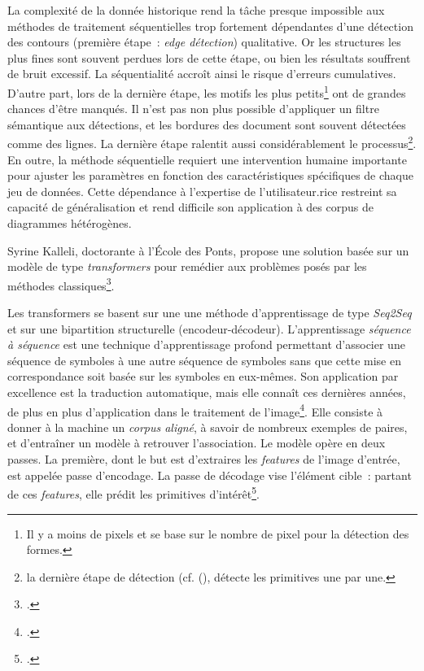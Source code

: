 La complexité de la donnée historique rend la tâche presque impossible
aux méthodes de traitement séquentielles trop fortement dépendantes d'une
détection des contours (première étape~: \emph{edge détection})
qualitative. Or les structures les plus fines sont souvent perdues lors
de cette étape, ou bien les résultats souffrent de bruit excessif. La
séquentialité accroît ainsi le risque d'erreurs cumulatives. D'autre
part, lors de la dernière étape, les motifs les plus petits\footnote{Il
  y a moins de pixels et \ransac se base sur le nombre de pixel pour la
  détection des formes.} ont de grandes chances d'être manqués. Il n'est
pas non plus possible d'appliquer un filtre sémantique aux détections,
et les bordures des document sont souvent détectées comme des lignes. La
dernière étape ralentit aussi considérablement le processus\footnote{la
  dernière étape de détection (cf.
  (\cite{noauthor_ransac_nodate}), détecte les
  primitives une par une.}. En outre, la méthode séquentielle requiert
une intervention humaine importante pour ajuster les paramètres en
fonction des caractéristiques spécifiques de chaque jeu de données.
Cette dépendance à l'expertise de l'utilisateur.rice restreint sa capacité de
généralisation et rend difficile son application à des corpus de
diagrammes hétérogènes.

Syrine Kalleli, doctorante à l'École des Ponts, propose une solution
basée sur un modèle de type \emph{transformers} pour remédier aux
problèmes posés par les méthodes classiques\footcite{kalleli_historical_2024}.

Les transformers se basent sur une une méthode d'apprentissage de type
\textit{Seq2Seq} et sur une bipartition structurelle (encodeur-décodeur).
L'apprentissage \emph{séquence à séquence} est une technique
d'apprentissage profond permettant d'associer une séquence de symboles à
une autre séquence de symboles sans que cette mise en correspondance
soit basée sur les symboles en eux-mêmes. Son application par excellence
est la traduction automatique, mais elle connaît ces dernières années,
de plus en plus d'application dans le traitement de l'image\footcite{dosovitskiy_image_2021}. Elle
consiste à donner à la machine un \emph{corpus aligné}, à savoir de
nombreux exemples de paires, et d'entraîner un modèle à retrouver
l'association. Le modèle opère en deux passes. La première, dont le but
est d'extraires les \emph{features} de l'image d'entrée, est appelée
passe d'encodage. La passe de décodage vise l'élément cible~: partant de
ces \emph{features}, elle prédit les primitives d'intérêt\footcite[p.90]{charniak_introduction_2021}.


